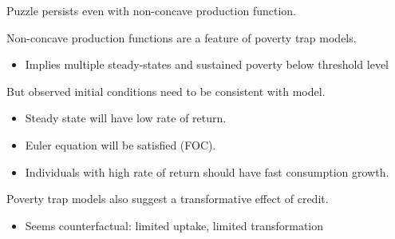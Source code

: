 \documentclass[aspectratio=169, 10pt, handout]{beamer}
\newenvironment{wideitemize}{\itemize\addtolength{\itemsep}{10pt}}{\enditemize}
\begin{document}
\begin{frame}{Puzzle persists even with non-concave production function.} %

\begin{wideitemize}

	\item Non-concave production functions are a feature of poverty trap models.
	
	\begin{itemize}
	
		\item Implies multiple steady-states and sustained poverty below threshold level

	\end{itemize}
	
	\item But observed initial conditions need to be consistent with model.
	
	\begin{itemize}
	
		\item Steady state will have low rate of return.
		
		\item Euler equation will be satisfied (FOC).
		
		\item Individuals with high rate of return should have fast consumption growth.
	
	\end{itemize}
	
	\item Poverty trap models also suggest a transformative effect of credit.

	\begin{itemize}

		\item Seems counterfactual: limited uptake, limited transformation \citep{banerjee2015microcred,meager2018understanding}
		
	\end{itemize}


\end{wideitemize}

\end{frame}
\end{document}
